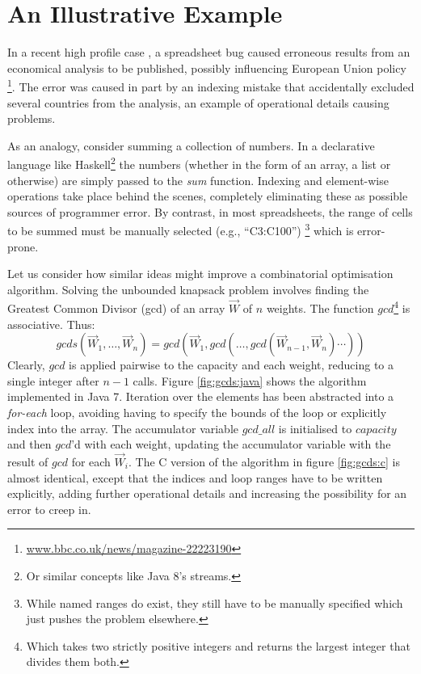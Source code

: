 \section{An Illustrative Example}

In a recent high profile case \cite{Herndon13}, a spreadsheet bug caused
erroneous results from an economical analysis to be published, possibly
influencing European Union policy%
\footnote{\url{www.bbc.co.uk/news/magazine-22223190}}.
The error was caused in part by an indexing mistake that accidentally excluded
several countries from the analysis, an example of operational details causing
problems.

As an analogy, consider summing a collection of numbers. In a declarative
language like Haskell\footnote{Or similar concepts like Java 8's streams.}
the numbers (whether in the form of an array, a list or
otherwise) are simply passed to the \emph{sum} function. Indexing and
element-wise operations take place behind the scenes, completely eliminating
these as possible sources of programmer error. By contrast, in most spreadsheets, the range of cells to
be summed must be manually selected (e.g., ``C3:C100'')%
\footnote{While named ranges do exist, they still have to be manually specified
which just pushes the problem elsewhere.} which is error-prone.

Let us consider how similar ideas might improve a combinatorial
optimisation algorithm. Solving the unbounded knapsack problem involves
finding the Greatest Common Divisor (gcd) of an array $\vec{W}$ of $n$
weights. The function $gcd$\footnote{Which takes two strictly positive integers and returns the largest integer that divides them both.}
is associative. Thus:
\[
gcds (\vec{W}_1, \ldots, \vec{W}_n) =
gcd(\vec{W}_1,gcd(\ldots,gcd (\vec{W}_{n-1},\vec{W}_n)\cdots))
\]
Clearly, $gcd$ is applied pairwise to the capacity and each weight,
reducing to a single integer after $n - 1$ calls. Figure \ref{fig:gcds:java} shows
the algorithm implemented in Java 7. Iteration over the elements has been
abstracted into a \emph{for-each} loop, avoiding having to specify the bounds
of the loop or explicitly index into the array. The accumulator variable $gcd\_all$ is initialised to
$capacity$ and then $gcd$'d with each weight, updating the accumulator
variable with the result of $gcd$ for each $\vec{W}_i$. The C version of
the algorithm in figure \ref{fig:gcds:c} is almost identical, except that the indices
and loop ranges have to be written explicitly, adding further operational details and 
increasing the possibility for an error to creep in.

